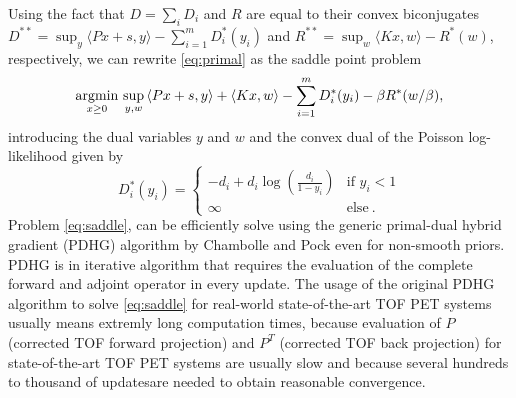 Using the fact that $D = \sum_i D_i$ and $R$ are equal to their convex biconjugates 
$D^{**} = \sup_y \langle Px + s, y \rangle - \sum_{i=1}^{m} D_i^*(y_i)$ 
and $R^{**} = \sup_w \langle Kx, w \rangle - R^*(w)$, respectively,
we can rewrite \eqref{eq:primal} as the saddle point problem
%
\begin{equation}
\operatorname*{argmin} _{x\geq 0} \, \sup_{y,w} \,  \langle Px + s, y \rangle + \langle Kx, w \rangle - \sum_{i=1}^{m} D_i^*(y_i) - \beta R^*(w/\beta) ,
\label{eq:saddle}
\end{equation}
%
introducing the dual variables $y$ and $w$ and the convex dual of the Poisson log-likelihood given by
%
\begin{equation}
D_i^*(y_i) =
\begin{cases}
-d_i + d_i \log \left( \frac{d_i}{1-y_i} \right) & \text{if } y_i < 1 \\
\infty & \text{else} \ .
\end{cases}
\end{equation}
%
Problem \eqref{eq:saddle}, can be efficiently solve using the generic primal-dual hybrid gradient (PDHG) 
algorithm by Chambolle and Pock \cite{Chambolle2011} even for non-smooth priors.
PDHG is in iterative algorithm that requires the evaluation of the complete forward and adjoint operator
in every update.
The usage of the original PDHG algorithm to solve \eqref{eq:saddle} for real-world state-of-the-art
TOF PET systems usually means extremly long computation times, because evaluation of $P$ (corrected TOF 
forward projection) and $P^T$ (corrected TOF back projection) 
for state-of-the-art TOF PET systems are usually slow and because several hundreds to thousand of updatesare needed to obtain reasonable convergence.

